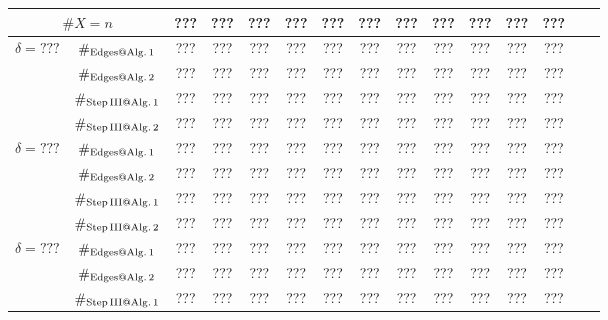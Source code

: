 \documentclass[12pt]{article}
\begin{document}
		\begin{table}[ht]
	\begin{center}\renewcommand{\arraystretch}{1.2}\small
		\setlength\tabcolsep{0.05cm}
		\begin{tabular}{|c|c||c|c|c|c|c|c|c|c|c|c|c|c|c|}
		\hline
		\multicolumn {2}{|c||}{\footnotesize $\#X=n$}  & ???& ???& ???& ???& ???& ???& ???& ???& ???& ???& ??? \\ 
		\hline		
		\hline
		\multirow{ 4}{*}{ $\delta = ???$}

        & $\#_{\rm Edges@ Alg.\, 1}$  &   ???& ???& ???& ???& ???& ???& ???& ???& ???& ???& ??? \\
        
        & $\#_{\rm Edges@ Alg.\, 2}$  &   ???& ???& ???& ???& ???& ???& ???& ???& ???& ???& ??? \\
		
		& $\#_{\rm Step\, III @ Alg.\, 1}$  &   ???& ???& ???& ???& ???& ???& ???& ???& ???& ???& ??? \\
		
		& $\#_{\rm Step\, III @ Alg.\, 2}$& ???& ???& ???& ???& ???& ???& ???& ???& ???& ???& ???   \\
		\hline
		\multirow{ 4}{*}{ $\delta = ???$}

        & $\#_{\rm Edges@ Alg.\, 1}$  &   ???& ???& ???& ???& ???& ???& ???& ???& ???& ???& ??? \\
        
        & $\#_{\rm Edges@ Alg.\, 2}$  &   ???& ???& ???& ???& ???& ???& ???& ???& ???& ???& ??? \\
		
		& $\#_{\rm Step\, III @ Alg.\, 1}$  &   ???& ???& ???& ???& ???& ???& ???& ???& ???& ???& ??? \\
		
		& $\#_{\rm Step\, III @ Alg.\, 2}$& ???& ???& ???& ???& ???& ???& ???& ???& ???& ???& ???   \\
		\hline
		\multirow{ 4}{*}{ $\delta = ???$}

        & $\#_{\rm Edges@ Alg.\, 1}$  &   ???& ???& ???& ???& ???& ???& ???& ???& ???& ???& ??? \\
        
        & $\#_{\rm Edges@ Alg.\, 2}$  &   ???& ???& ???& ???& ???& ???& ???& ???& ???& ???& ??? \\
		
		& $\#_{\rm Step\, III @ Alg.\, 1}$  &   ???& ???& ???& ???& ???& ???& ???& ???& ???& ???& ??? \\
		

\end{tabular}
\end{center}
\end{table}
\end{document}
